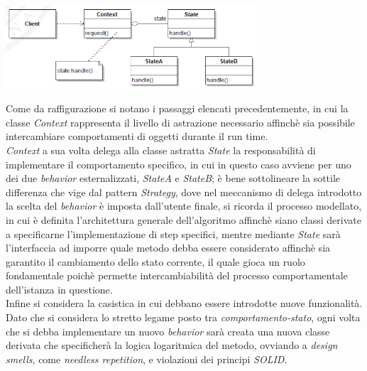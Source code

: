 \documentclass{article}
\begin{document}
\begin{center}
    \includegraphics[width=0.7\textwidth]{foto 1.png}
\end{center}
Come da raffigurazione si notano i passaggi elencati precedentemente, in cui la classe \textit{Context} rappresenta il livello di astrazione necessario affinchè sia possibile intercambiare comportamenti di oggetti durante il run time.\\
\textit{Context} a sua volta delega alla classe astratta \textit{State} la responsabilità di implementare il comportamento specifico, in cui in questo caso avviene per uno dei due \textit{behavior} esternalizzati, \textit{StateA} e \textit{StateB}; è bene sottolineare la sottile differenza che vige dal pattern \textit{Strategy}, dove nel meccanismo di delega introdotto la scelta del \textit{behavior} è imposta dall'utente finale, si ricorda il processo modellato, in cui è definita l'architettura generale dell'algoritmo affinchè siano classi derivate a specificarne l'implementazione di step specifici, mentre mediante \textit{State} sarà l'interfaccia ad imporre quale metodo debba essere considerato affinchè sia garantito il cambiamento dello stato corrente, il quale gioca un ruolo fondamentale poichè permette  intercambiabilità del processo comportamentale dell'istanza in questione.\vspace*{14pt}\\
Infine si considera la casistica in cui debbano essere introdotte nuove funzionalità. Dato che si considera lo stretto legame posto tra \textit{comportamento-stato}, ogni volta che si debba implementare un nuovo \textit{behavior} sarà creata una nuova classe derivata che specificherà la logica logaritmica del metodo, ovviando a \textit{design smells}, come \textit{needless repetition}, e violazioni dei principi \textit{SOLID}. 
\end{document}
